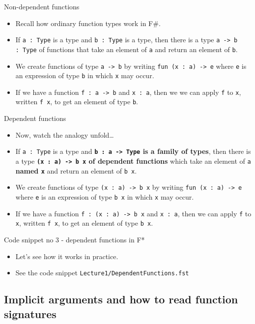 \documentclass{beamer}
\newcommand{\m}[1]{\texttt{#1}}
\begin{document}
\begin{frame}{Non-dependent functions}
\begin{itemize}
	\item Recall how ordinary function types work in F\#.
	\item If \m{a :\ Type} is a type and \m{b :\ Type} is a type, then there is a type \m{a -> b :\ Type} of functions that take an element of \m{a} and return an element of \m{b}.
	\item We create functions of type \m{a -> b} by writing \m{fun (x : a) -> e} where \m{e} is an expression of type \m{b} in which \m{x} may occur.
	\item If we have a function \m{f :\ a -> b} and \m{x :\ a}, then we we can apply \m{f} to \m{x}, written \m{f x}, to get an element of type \m{b}.
\end{itemize}
\end{frame}

\begin{frame}{Dependent functions}
\begin{itemize}
	\item Now, watch the analogy unfold\dots
	\item If \m{a :\ Type} is a type and \textbf{\m{b :\ a -> Type} is a family of types}, then there is a type \textbf{\m{(x :\ a) -> b x} of dependent functions} which take an element of \m{a} \textbf{named \m{x}} and return an element of \m{b x}.
	\item We create functions of type \m{(x :\ a) -> b x} by writing \m{fun (x :\ a) -> e} where \m{e} is an expression of type \m{b x} in which \m{x} may occur.
	\item If we have a function \m{f :\ (x :\ a) -> b x} and \m{x :\ a}, then we can apply \m{f} to \m{x}, written \m{f x}, to get an element of type \m{b x}.
\end{itemize}
\end{frame}

\begin{frame}{Code snippet no 3 - dependent functions in F*}
\begin{itemize}
	\item Let's see how it works in practice.
	\item See the code snippet \m{Lecture1/DependentFunctions.fst}
\end{itemize}
\end{frame}


\subsection{Implicit arguments and how to read function signatures}
\end{document}
